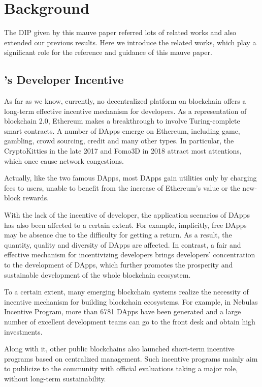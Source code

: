 \section{Background}
\label{sec:background}
\noindent
The DIP given by this mauve paper referred  lots of related works and also extended our previous results. Here we introduce the related works, which play a significant role for the  reference and guidance of this mauve paper.

\subsection{\dapp's Developer Incentive}
\noindent
As far as we know, currently, no decentralized platform on blockchain offers a
long-term effective incentive mechanism for \dapp developers. As a
representation of blockchain 2.0, Ethereum makes a breakthrough to involve
Turing-complete smart contracts. A number of DApps emerge on Ethereum,
including game, gambling, crowd sourcing, credit and many other types. In
particular, the CryptoKitties in the late 2017 and Fomo3D in 2018 attract most
attentions, which once cause network congestions.

Actually, like the two famous DApps, most DApps gain utilities only by charging
fees to users, unable to benefit from the increase of Ethereum's value or the
new-block rewards.

With the lack of the incentive of developer, the application scenarios of DApps
has also been affected to a certain extent. For example, implicitly, free DApps
may be absence due to the difficulty for getting a return. As a result, the
quantity, quality and diversity of DApps are affected. In contrast, a fair and
effective mechanism for incentivizing developers brings developers'
concentration to the development of DApps, which further promotes the prosperity and sustainable development of the whole blockchain ecosystem.

To a certain extent, many emerging blockchain systems realize the necessity of incentive mechanism for building blockchain ecosystems. For example, in Nebulas Incentive Program, more than 6781 DApps have been generated and a large number of excellent development teams can go to the front desk and obtain high investments.

Along with it, other public blockchains also launched short-term incentive programs based on centralized management. Such incentive programs mainly aim to publicize to the community with official evaluations taking a major role, without long-term sustainability.


